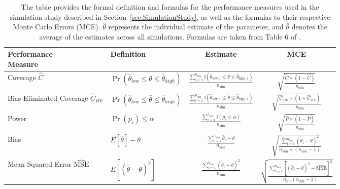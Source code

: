 \documentclass[pdflatex,sn-vancouver-ay]{sn-jnl}%
\theoremstyle{thmstyleone}%
\theoremstyle{thmstyletwo}%
\theoremstyle{thmstylethree}%
\begin{document}
\begin{appendices}
\begin{table}[h]
	
	\begin{tabular*}{\textwidth}{@{\extracolsep\fill}llcc}
		\toprule%
		\shortstack[l]{\textbf{Performance}\\\textbf{Measure}} & \textbf{Definition} & \textbf{Estimate} & \textbf{MCE} \\
		\midrule
		Coverage $\hat{C}$ & $\operatorname{Pr}(\hat{\theta}_{low} \leq \theta \leq \hat{\theta}_{high})$ & $\frac{\sum_{i=1}^{n_{\text{sim}}} \mathbb{I}\left( \hat{\theta}_{\text{low},i} \leq \theta \leq \hat{\theta}_{\text{high},i} \right)}{n_{\text{sim}}} $ & $\sqrt{\frac{\hat{C} \times (1 - \hat{C})}{n_{\text{sim}}}}$ \\
		\addlinespace
		\shortstack[l]{Bias-Eliminated\\Coverage $\hat{C}_{BE}$} & $\operatorname{Pr}(\hat{\theta}_{low} \leq \bar{\theta} \leq \hat{\theta}_{high})$ & $\frac{\sum_{i=1}^{n_{\text{sim}}} \mathbb{I}\left( \hat{\theta}_{\text{low},i} \leq \bar{\theta} \leq \hat{\theta}_{\text{high},i} \right)}{n_{\text{sim}}}$ & $\sqrt{\frac{\hat{C}_{BE} \times (1 - \hat{C}_{BE})}{n_{\text{sim}}}}$ \\
		\addlinespace
		Power & $\operatorname{Pr}(p_i) \leq \alpha$ & $\frac{\sum_{i=1}^{n_{\text{sim}}} \mathbb{I}(p_i \leq \alpha)}{n_{\text{sim}}} $ & $\sqrt{\frac{\hat{P} \times (1 - \hat{P})}{n_{\text{sim}}}}$ \\
		\addlinespace
		Bias & $E[\hat{\theta}]-\theta$ & $\frac{\sum_{i=1}^{n_{sim}}{\hat{\theta}_i - \theta}}{n_{sim}}$ & $\sqrt{\frac{\sum_{i=1}^{n_{sim}}{(\hat{\theta}_i - \theta)^2}}{n_{sim} \times (n_{sim}-1) }}$ \\
		\addlinespace
		\shortstack[l]{Mean Squared\\Error $\widehat{\text{MSE}}$} & $E[(\hat{\theta}-\theta)^2]$ & $\frac{\sum_{i=1}^{n_{\text{sim}}} (\hat{\theta}_i - \theta)^2}{n_{\text{sim}}}$ & $\sqrt{\frac{\sum_{i=1}^{n_{\text{sim}}} \left[(\hat{\theta}_i - \theta)^2 - \widehat{\text{MSE}}\right]^2}{n_{\text{sim}}(n_{\text{sim}} - 1)}}$ \\
		\bottomrule
	\end{tabular*}
    \caption{The table provides the formal definition and formulas for the performance measures used in the simulation study described in Section~\ref{sec:SimulationStudy}, as well as the formulas to their respective Monte Carlo Errors (MCE). $\hat{\theta}$ represents the individual estimate of the parameter, and $\bar{\theta}$ denotes the average of the estimates across all simulations. Formulas are taken from Table 6 of \cite{morrisUsingSimulationStudies2019a}.}
    \label{tbl:PerformFormulas}
\end{table}





\end{appendices}
\end{document}
